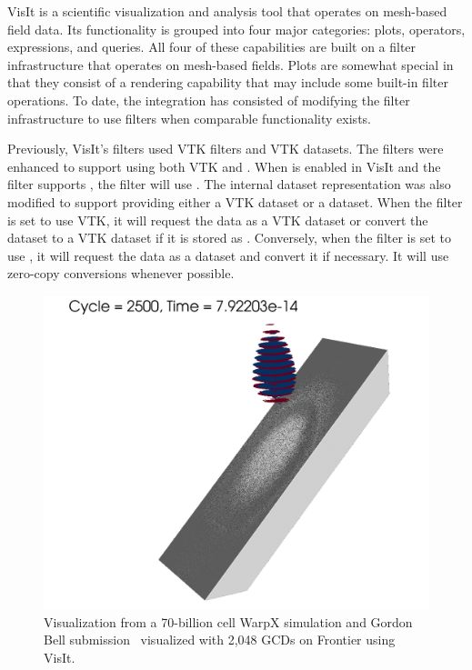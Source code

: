VisIt is a scientific visualization and analysis tool that operates on mesh-based field data.
Its functionality is grouped into four major categories: plots, operators, expressions, and queries.
All four of these capabilities are built on a filter infrastructure that operates on mesh-based fields.
Plots are somewhat special in that they consist of a rendering capability that may include some built-in filter operations.
To date, the \vtkm integration has consisted of modifying the filter infrastructure to use \vtkm filters when comparable \vtkm functionality exists.


Previously, VisIt's filters used VTK filters and VTK datasets.
The filters were enhanced to support using both VTK and \vtkm.
When \vtkm is enabled in VisIt and the filter supports \vtkm, the filter will use \vtkm.
The internal dataset representation was also modified to support providing either a VTK dataset or a \vtkm dataset.
When the filter is set to use VTK, it will request the data as a VTK dataset or convert the dataset to a VTK dataset if it is stored as \vtkm.
Conversely, when the filter is set to use \vtkm, it will request the data as a \vtkm dataset and convert it if necessary.
It will use zero-copy conversions whenever possible.

\begin{figure}[htb]
  \includegraphics[width=\linewidth]{figures/visit_warpx_frontier.png}
  \caption{Visualization from a 70-billion cell WarpX simulation and Gordon Bell submission~\citep{FedeliHuebl2022} visualized with 2,048 GCDs on Frontier using VisIt.}
  \label{fig:visit_warpx_frontier}
\end{figure}

